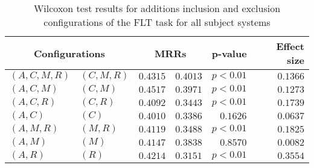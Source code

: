 
\begin{table}
\begin{spacing}{1.2}
\centering
\caption{Wilcoxon test results for additions inclusion and exclusion configurations of the FLT task for all subject systems}
\label{table:versus-wilcox-all-flt-additions}
\begin{tabular}{ll|rr|rr}
\toprule
      \multicolumn{2}{c|}{Configurations} &          \multicolumn{2}{c|}{MRRs} &       p-value & Effect size \\
\midrule
 $(A,C,M,R)$ &  $(C,M,R)$ & $0.4315$ & $0.4013$ & $p<0.01$ &    $0.1366$ \\
   $(A,C,M)$ &    $(C,M)$ & $0.4517$ & $0.3971$ & $p<0.01$ &    $0.1273$ \\
   $(A,C,R)$ &    $(C,R)$ & $0.4092$ & $0.3443$ & $p<0.01$ &    $0.1739$ \\
     $(A,C)$ &      $(C)$ & $0.4010$ & $0.3386$ & $0.1626$ &    $0.0637$ \\
   $(A,M,R)$ &    $(M,R)$ & $0.4119$ & $0.3488$ & $p<0.01$ &    $0.1825$ \\
     $(A,M)$ &      $(M)$ & $0.4147$ & $0.3838$ & $0.8570$ &    $0.0082$ \\
     $(A,R)$ &      $(R)$ & $0.4214$ & $0.3151$ & $p<0.01$ &    $0.3554$ \\
\bottomrule
\end{tabular}

\end{spacing}
\end{table}

